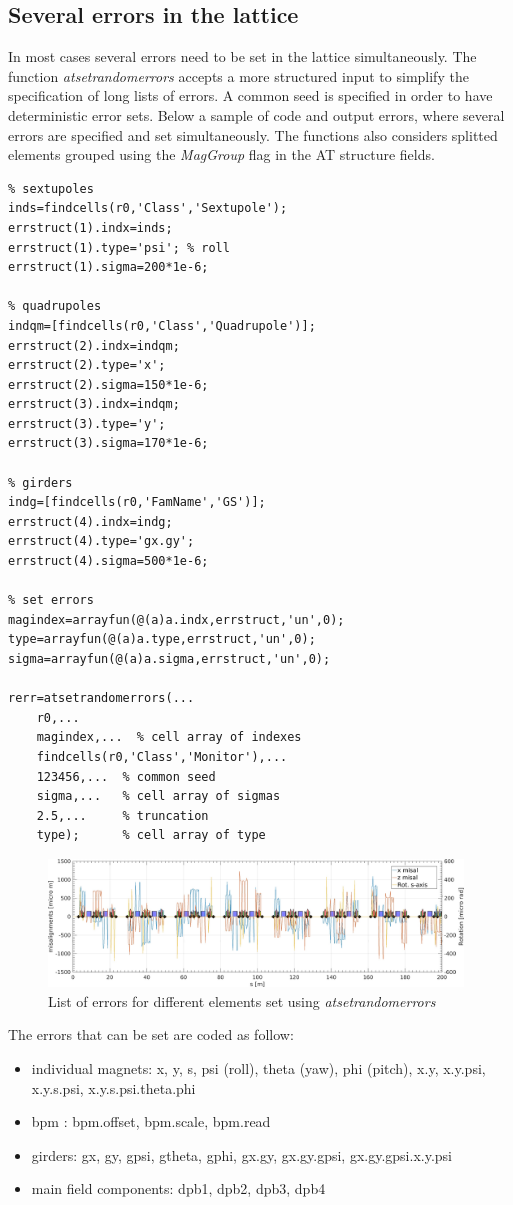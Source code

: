 \clearpage
\subsection{Several errors in the lattice}
In most cases several errors need to be set in the lattice simultaneously. The function \emph{atsetrandomerrors} accepts a more structured input to simplify the specification of long lists of errors. A common seed is specified in order to have deterministic error sets. Below a sample of code and output errors, where several errors are specified and set simultaneously. The functions also considers splitted elements grouped using the \emph{MagGroup} flag in the AT structure fields. 

\begin{lstlisting}
% sextupoles
inds=findcells(r0,'Class','Sextupole');
errstruct(1).indx=inds;
errstruct(1).type='psi'; % roll
errstruct(1).sigma=200*1e-6;

% quadrupoles
indqm=[findcells(r0,'Class','Quadrupole')];
errstruct(2).indx=indqm;
errstruct(2).type='x';
errstruct(2).sigma=150*1e-6;
errstruct(3).indx=indqm;
errstruct(3).type='y';
errstruct(3).sigma=170*1e-6;

% girders
indg=[findcells(r0,'FamName','GS')];
errstruct(4).indx=indg;
errstruct(4).type='gx.gy';
errstruct(4).sigma=500*1e-6;

% set errors
magindex=arrayfun(@(a)a.indx,errstruct,'un',0);
type=arrayfun(@(a)a.type,errstruct,'un',0);
sigma=arrayfun(@(a)a.sigma,errstruct,'un',0);

rerr=atsetrandomerrors(...
    r0,...
    magindex,...  % cell array of indexes
    findcells(r0,'Class','Monitor'),...
    123456,...  % common seed
    sigma,...   % cell array of sigmas
    2.5,...     % truncation
    type);      % cell array of type
\end{lstlisting}

\begin{figure}[!h]
	\centering
	\includegraphics[width=0.98\textwidth]{./images/LargeList/LargeList.jpg}
	\caption{List of errors for different elements set using \emph{atsetrandomerrors}}
	\label{fig:girdxyrol}
\end{figure}
The errors that can be set are coded as follow:
\begin{itemize}
\item individual magnets: x, y, s, psi (roll), theta (yaw), phi (pitch), x.y, x.y.psi, x.y.s.psi, x.y.s.psi.theta.phi
\item bpm : bpm.offset, bpm.scale, bpm.read 
\item girders: gx, gy, gpsi, gtheta, gphi,  gx.gy, gx.gy.gpsi, gx.gy.gpsi.x.y.psi
\item main field components: dpb1, dpb2, dpb3, dpb4  
\end{itemize}

